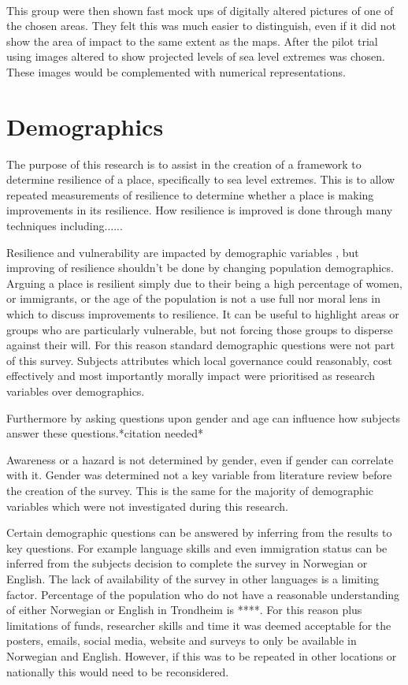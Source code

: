 \paragraph{}

This group were then shown fast mock ups of digitally altered pictures of one of the chosen areas. They felt this was much easier to distinguish, even if it did not show the area of impact to the same extent as the maps. 
After the pilot trial using images altered to show projected levels of sea level extremes was chosen. These images would be complemented with numerical representations. 


\section{Demographics}
The purpose of this research is to assist in the creation of a framework to determine resilience of a place, specifically to sea level extremes. This is to allow repeated measurements of resilience to determine whether a place is making improvements in its resilience. How resilience is improved is done through many techniques including......

Resilience and vulnerability are impacted by demographic variables \cite{rod_integrated_2012}, but improving of resilience shouldn't be done by changing population demographics. Arguing a place is resilient simply due to their being a high percentage of women, or immigrants, or the age of the population is not a use full nor moral lens in which to discuss improvements to resilience. It can be useful to highlight areas or groups who are particularly vulnerable, but not forcing those groups to disperse against their will. For this reason standard demographic questions were not part of this survey. Subjects attributes which local governance could reasonably, cost effectively and most importantly morally impact were prioritised as research variables over demographics. 

Furthermore by asking questions upon gender and age can influence how subjects answer these questions.*citation needed*

Awareness or a hazard is not determined by gender, even if gender can correlate with it.  Gender was determined not a key variable from literature review before the creation of the survey. This is the same for the majority of demographic variables which were not investigated during this research.

Certain demographic questions can be answered by inferring from the results to key questions. For example language skills and even immigration status can be inferred from the subjects decision to complete the survey in Norwegian or English. The lack of availability of the survey in other languages is a limiting factor. Percentage of the population who do not have a reasonable understanding of either Norwegian or English in Trondheim is ****. For this reason plus limitations of funds, researcher skills and time it was deemed acceptable for the posters, emails, social media, website and surveys to only be available in Norwegian and English. However, if this was to be repeated in other locations or nationally this would need to be reconsidered. 

